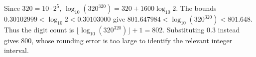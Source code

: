 Since $320=10\cdot2^5$, $\log_{10}(320^{320})=320+1600\log_{10}2$. The bounds $0.30102999<\log_{10}2<0.30103000$ give $801.647984<\log_{10}(320^{320})<801.648$. Thus the digit count is $\lfloor\log_{10}(320^{320})\rfloor+1=\boxed{802}$. Substituting $0.3$ instead gives $800$, whose rounding error is too large to identify the relevant integer interval.
